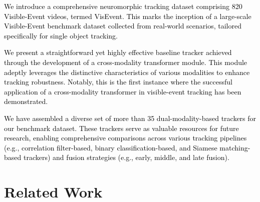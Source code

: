 \documentclass[journal]{IEEEtran}
\begin{document}
 \textcolor{black}{We introduce a comprehensive neuromorphic tracking dataset comprising 820 Visible-Event videos, termed VisEvent. This marks the inception of a large-scale Visible-Event benchmark dataset collected from real-world scenarios, tailored specifically for single object tracking.}

 \textcolor{black}{We present a straightforward yet highly effective baseline tracker achieved through the development of a cross-modality transformer module. This module adeptly leverages the distinctive characteristics of various modalities to enhance tracking robustness. Notably, this is the first instance where the successful application of a cross-modality transformer in visible-event tracking has been demonstrated.} 

 \textcolor{black}{We have assembled a diverse set of more than 35 dual-modality-based trackers for our benchmark dataset. These trackers serve as valuable resources for future research, enabling comprehensive comparisons across various tracking pipelines (e.g., correlation filter-based, binary classification-based, and Siamese matching-based trackers) and fusion strategies (e.g., early, middle, and late fusion).} 












	



\section{Related Work} 
\end{document}

